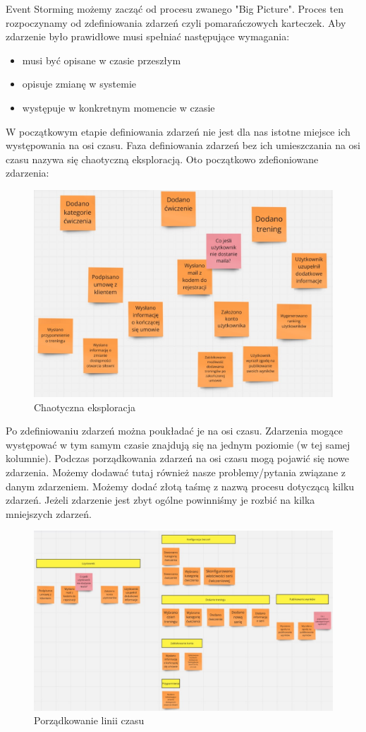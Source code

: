 \documentclass{article}
\begin{document}
      Event Storming możemy zacząć od procesu zwanego "Big Picture". Proces ten rozpoczynamy od zdefiniowania zdarzeń czyli pomarańczowych karteczek. Aby zdarzenie było prawidłowe musi spełniać następujące wymagania:
      \begin{itemize}
            \item musi być opisane w czasie przeszłym
            \item opisuje zmianę w systemie
            \item występuje w konkretnym momencie w czasie
      \end{itemize}
      W początkowym etapie definiowania zdarzeń nie jest dla nas istotne miejsce ich występowania na osi czasu. Faza definiowania zdarzeń bez ich umieszczania na osi czasu nazywa się chaotyczną eksploracją. Oto początkowo zdefioniowane zdarzenia:
      \begin{figure}
            \centering
            \includegraphics[width=0.9\linewidth]{bigPicture1.jpg}
            \caption{Chaotyczna eksploracja}
      \end{figure}
      Po zdefiniowaniu zdarzeń można poukładać je na osi czasu. Zdarzenia mogące występować w tym samym czasie znajdują się na jednym poziomie (w tej samej kolumnie). Podczas porządkowania zdarzeń na osi czasu mogą pojawić się nowe zdarzenia. Możemy dodawać tutaj również nasze problemy/pytania związane z danym zdarzeniem. Możemy dodać złotą taśmę z nazwą procesu dotyczącą kilku zdarzeń. Jeżeli zdarzenie jest zbyt ogólne powinniśmy je rozbić na kilka mniejszych zdarzeń.
      \begin{figure}
            \centering
            \includegraphics[width=0.9\linewidth]{bigPicture3.jpg}
            \caption{Porządkowanie linii czasu}
      \end{figure}
\end{document}
